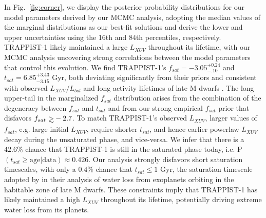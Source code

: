 \documentclass[twocolumn]{aastex62}
\def\gsim{~\rlap{$>$}{\lower 1.0ex\hbox{$\sim$}}}
\begin{document}
In Fig.~\ref{fig:corner}, we display the posterior probability distributions for our model parameters derived by our MCMC analysis, adopting the median values of the marginal distributions as our best-fit solutions and derive the lower and upper uncertainties using the 16th and 84th percentiles, respectively. TRAPPIST-1 likely maintained a large $L_{XUV}$ throughout its lifetime, with our MCMC analysis uncovering strong correlations between the model parameters that control this evolution. We find TRAPPIST-1's $f_{sat} = -3.05^{+0.24}_{-.10}$ and $t_{sat} = 6.85^{+3.43}_{-3.15}$ Gyr, both deviating significantly from their priors and consistent with observed $L_{XUV}/L_{bol}$ and long activity lifetimes of late M dwarfs \citep{West2008,Wright2018}. The long upper-tail in the marginalized $f_{sat}$ distribution arises from the combination of the degeneracy between $f_{sat}$ and $t_{sat}$ and from our strong empirical $f_{sat}$ prior that disfavors $f_{sat} \gsim -2.7$. To match TRAPPIST-1's observed $L_{XUV}$, larger values of $f_{sat}$, e.g. large initial $L_{XUV}$, require shorter $t_{sat}$, and hence earlier powerlaw $L_{XUV}$ decay during the unsaturated phase, and vice-versa. We infer that there is a $42.6\%$ chance that TRAPPIST-1 is still in the saturated phase today, i.e. P$(t_{sat} \geq \mathrm{ age } | \mathrm{data}) \approx 0.426$. Our analysis strongly disfavors short saturation timescales, with only a $0.4\%$ chance that $t_{sat} \leq 1$ Gyr, the saturation timescale adopted by \citet{Luger2015} in their analysis of water loss from exoplanets orbiting in the habitable zone of late M dwarfs. These constraints imply that TRAPPIST-1 has likely maintained a high $L_{XUV}$ throughout its lifetime, potentially driving extreme water loss from its planets.
\end{document}
